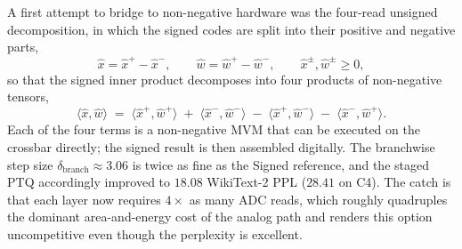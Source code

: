 \documentclass[a4paper,11pt,oneside]{article}
\theoremstyle{breakstyle}
\begin{document}
  A first attempt to bridge to non-negative hardware was the
  four-read unsigned decomposition, in which the signed codes are split
  into their positive and negative parts,
  \begin{equation}
      \hat{x} = \hat{x}^{+} - \hat{x}^{-},
      \qquad
      \hat{w} = \hat{w}^{+} - \hat{w}^{-},
      \qquad
      \hat{x}^{\pm}, \hat{w}^{\pm} \geq 0,
  \end{equation}
  so that the signed inner product decomposes into four products
  of non-negative tensors,
  \begin{equation}
      \langle \hat{x}, \hat{w} \rangle
      \;=\;
      \langle \hat{x}^{+}, \hat{w}^{+} \rangle
      \;+\; \langle \hat{x}^{-}, \hat{w}^{-} \rangle
      \;-\; \langle \hat{x}^{+}, \hat{w}^{-} \rangle
      \;-\; \langle \hat{x}^{-}, \hat{w}^{+} \rangle.
      \label{eq:four_quadrant}
  \end{equation}
  Each of the four terms is a non-negative MVM that can be
  executed on the crossbar directly; the signed result is then
  assembled digitally.  The branchwise step size
  $\delta_{\mathrm{branch}} \approx 3.06$ is twice as fine as the
  Signed reference, and the staged PTQ accordingly improved to
  $18.08$ WikiText-2 PPL ($28.41$ on C4).  The catch is that each
  layer now requires $4\times$ as many ADC reads, which roughly
  quadruples the dominant area-and-energy cost of the analog path
  and renders this option uncompetitive even though the perplexity
  is excellent.
\end{document}
